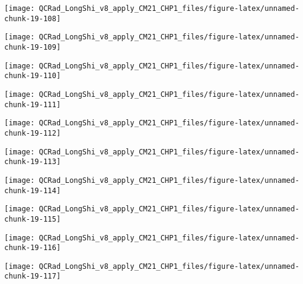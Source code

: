 \documentclass[
  10pt,
  a4paper,oneside]{article}
\begin{document}
\begin{center}\texttt{[image: QCRad\_LongShi\_v8\_apply\_CM21\_CHP1\_files/figure-latex/unnamed-chunk-19-108]} \end{center}

\begin{center}\texttt{[image: QCRad\_LongShi\_v8\_apply\_CM21\_CHP1\_files/figure-latex/unnamed-chunk-19-109]} \end{center}

\begin{center}\texttt{[image: QCRad\_LongShi\_v8\_apply\_CM21\_CHP1\_files/figure-latex/unnamed-chunk-19-110]} \end{center}

\begin{center}\texttt{[image: QCRad\_LongShi\_v8\_apply\_CM21\_CHP1\_files/figure-latex/unnamed-chunk-19-111]} \end{center}

\begin{center}\texttt{[image: QCRad\_LongShi\_v8\_apply\_CM21\_CHP1\_files/figure-latex/unnamed-chunk-19-112]} \end{center}

\begin{center}\texttt{[image: QCRad\_LongShi\_v8\_apply\_CM21\_CHP1\_files/figure-latex/unnamed-chunk-19-113]} \end{center}

\begin{center}\texttt{[image: QCRad\_LongShi\_v8\_apply\_CM21\_CHP1\_files/figure-latex/unnamed-chunk-19-114]} \end{center}

\begin{center}\texttt{[image: QCRad\_LongShi\_v8\_apply\_CM21\_CHP1\_files/figure-latex/unnamed-chunk-19-115]} \end{center}

\begin{center}\texttt{[image: QCRad\_LongShi\_v8\_apply\_CM21\_CHP1\_files/figure-latex/unnamed-chunk-19-116]} \end{center}

\begin{center}\texttt{[image: QCRad\_LongShi\_v8\_apply\_CM21\_CHP1\_files/figure-latex/unnamed-chunk-19-117]} \end{center}
\end{document}
